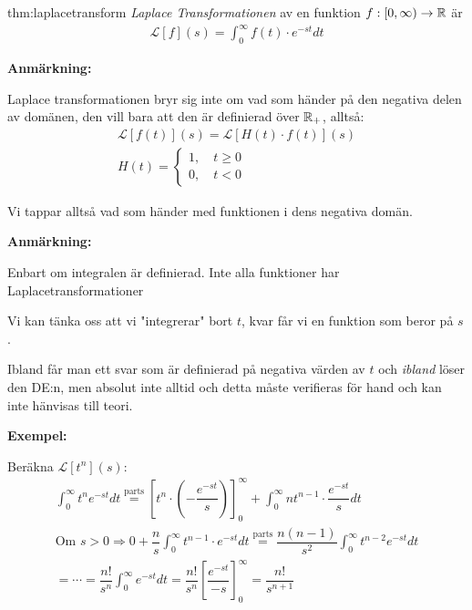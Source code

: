 \begin{theo}{thm:laplacetransform}
  \textit{Laplace Transformationen} av en funktion $f:[0,\infty)\to\mathbb{R}$ är
  \begin{equation*}
    \begin{gathered}
      \mathcal{L}[f](s) = \int_{0}^{\infty}f(t)\cdot e^{-st}dt
    \end{gathered}
  \end{equation*}
  \par\bigskip
  \noindent\textbf{Anmärkning:}\par
  \noindent Laplace transformationen bryr sig inte om vad som händer på den negativa delen av domänen, den vill bara att den är definierad över $\mathbb{R}_+$, alltså:
  \begin{equation*}
    \begin{gathered}
      \mathcal{L}[f(t)](s) = \mathcal{L}[H(t)\cdot f(t)](s)\\
      H(t) = 
      \begin{cases*}
        1,\quad t\geq0\\
        0,\quad t<0
      \end{cases*}
    \end{gathered}
  \end{equation*}\par
  \noindent Vi tappar alltså vad som händer med funktionen i dens negativa domän.
  \par\bigskip
  \noindent\textbf{Anmärkning:}\par
  \noindent Enbart om integralen är definierad. Inte alla funktioner har Laplacetransformationer
  \par\bigskip
  \noindent Vi kan tänka oss att vi "integrerar" bort $t$, kvar får vi en funktion som beror på $s$.
\end{theo}
\par\bigskip
\noindent Ibland får man ett svar som är definierad på negativa värden av $t$ och \textit{ibland} löser den DE:n, men absolut inte alltid och detta måste verifieras för hand och kan inte hänvisas till teori.
\par\bigskip
\noindent\textbf{Exempel:}\par
\noindent Beräkna $\mathcal{L}[t^n](s)$:
\begin{equation*}
  \begin{gathered}
    \int_{0}^{\infty}t^ne^{-st}dt\stackrel{\text{parts}}{=} \left[t^n\cdot(-\dfrac{e^{-st}}{s})\right]_0^\infty+\int_{0}^{\infty}nt^{n-1}\cdot\dfrac{e^{-st}}{s}dt\\
    \text{Om } s>0\Rightarrow 0+\dfrac{n}{s}\int_{0}^{\infty}t^{n-1}\cdot e^{-st}dt\stackrel{\text{parts}}{=}\dfrac{n(n-1)}{s^2}\int_{0}^{\infty}t^{n-2}e^{-st}dt\\
    =\cdots=\dfrac{n!}{s^n}\int_{0}^{\infty}e^{-st}dt = \dfrac{n!}{s^n}\left[\dfrac{e^{-st}}{-s}\right]_0^\infty = \dfrac{n!}{s^{n+1}}
  \end{gathered}
\end{equation*}

